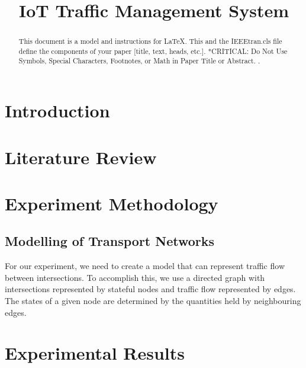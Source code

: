 \documentclass[conference]{IEEEtran}
\begin{document}
\title{IoT Traffic Management System}

\author{
\and
{}
}

\maketitle

\begin{abstract}
This document is a model and instructions for \LaTeX.
This and the IEEEtran.cls file define the components of your paper [title, text, heads, etc.]. *CRITICAL: Do Not Use Symbols, Special Characters, Footnotes, 
or Math in Paper Title or Abstract. \cite{Chong}\cite{Rizwan}\cite{Avetifipour}\cite{GOTTLICH}\cite{Ghena}.
\end{abstract}

\section{Introduction}
\section{Literature Review}
\section{Experiment Methodology}

\subsection{Modelling of Transport Networks}

For our experiment, we need to create a model that can represent traffic flow between intersections. To accomplish this, we use a directed graph with intersections represented by stateful nodes and traffic flow represented by edges. The states of a given node are determined by the quantities held by neighbouring edges.

\section{Experimental Results}


\printbibliography
\end{document}
